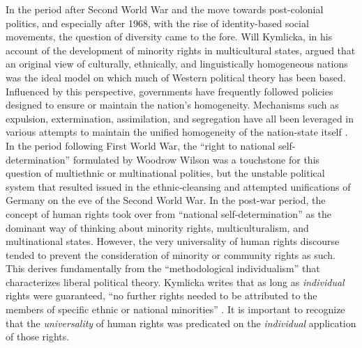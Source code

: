 \documentclass[12pt,oneside]{memoir}
\begin{document}
In the period after Second World War and the move towards post-colonial politics, and especially after 1968, with the rise of identity-based social movements, the question of diversity came to the fore. Will Kymlicka, in his account of the development of minority rights in multicultural states, argued that an original view of culturally, ethnically, and linguistically homogeneous nations was the ideal model on which much of Western political theory has been based. Influenced by this perspective, governments have frequently followed policies designed to ensure or maintain the nation's homogeneity. Mechanisms such as expulsion, extermination, assimilation, and segregation have all been leveraged in various attempts to maintain the unified homogeneity of the nation-state itself \cite{kymlicka-citizenship}. In the period following First World War, the ``right to national self-determination'' formulated by Woodrow Wilson was a touchstone for this question of multiethnic or multinational polities, but the unstable political system that resulted issued in the ethnic-cleansing and attempted unifications of Germany on the eve of the Second World War. 
In the post-war period, the concept of human rights took over from ``national self-determination'' as the dominant way of thinking about minority rights, multiculturalism, and multinational states. However, the very universality of human rights discourse tended to prevent the consideration of minority or community rights as such. This derives fundamentally from the ``methodological individualism'' that characterizes liberal political theory. Kymlicka writes that as long as \textit{individual }rights were guaranteed, ``no further rights needed to be attributed to the members of specific ethnic or national minorities'' \cite{kymlicka-citizenship}. It is important to recognize that the \textit{universality }of human rights was predicated on the \textit{individual} application of those rights. 

\backmatter

 

\end{document}
